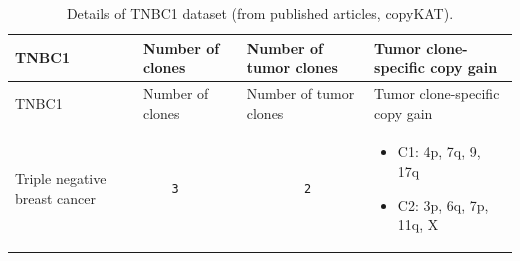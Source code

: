 \documentclass[
]{book}
\providecommand{\tightlist}{%
  \setlength{\itemsep}{0pt}\setlength{\parskip}{0pt}}
\begin{document}
\begin{longtable}[]{@{}llll@{}}
\caption{Details of TNBC1 dataset (from published articles, copyKAT).}\tabularnewline
\toprule
\begin{minipage}[b]{0.25\columnwidth}\raggedright
TNBC1\strut
\end{minipage} & \begin{minipage}[b]{0.16\columnwidth}\raggedright
Number of clones\strut
\end{minipage} & \begin{minipage}[b]{0.19\columnwidth}\raggedright
Number of tumor clones\strut
\end{minipage} & \begin{minipage}[b]{0.29\columnwidth}\raggedright
Tumor clone-specific copy gain\strut
\end{minipage}\tabularnewline
\midrule
\endfirsthead
\toprule
\begin{minipage}[b]{0.25\columnwidth}\raggedright
TNBC1\strut
\end{minipage} & \begin{minipage}[b]{0.16\columnwidth}\raggedright
Number of clones\strut
\end{minipage} & \begin{minipage}[b]{0.19\columnwidth}\raggedright
Number of tumor clones\strut
\end{minipage} & \begin{minipage}[b]{0.29\columnwidth}\raggedright
Tumor clone-specific copy gain\strut
\end{minipage}\tabularnewline
\midrule
\endhead
\begin{minipage}[t]{0.25\columnwidth}\raggedright
Triple negative breast cancer\strut
\end{minipage} & \begin{minipage}[t]{0.16\columnwidth}\raggedright
\begin{verbatim}
    3
\end{verbatim}
\strut
\end{minipage} & \begin{minipage}[t]{0.19\columnwidth}\raggedright
\begin{verbatim}
        2
\end{verbatim}
\strut
\end{minipage} & \begin{minipage}[t]{0.29\columnwidth}\raggedright
\begin{itemize}
\tightlist
\item
  C1: 4p, 7q, 9, 17q
\item
  C2: 3p, 6q, 7p, 11q, X
\end{itemize}\strut
\end{minipage}\tabularnewline
\bottomrule
\end{longtable}
\end{document}
